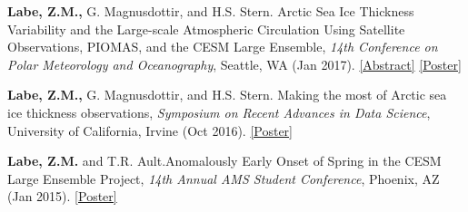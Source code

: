 \documentclass[margin,line,palatino,courier,10pt]{res}
\begin{document}
\begin{resume}
\begin{etaremune}[leftmargin=0in,topsep=0in,parsep=0in]
\item \textbf{Labe, Z.M.,} G. Magnusdottir, and H.S. Stern. Arctic Sea Ice Thickness Variability and the Large-scale Atmospheric Circulation Using Satellite Observations, PIOMAS, and the CESM Large Ensemble, \textit{14th Conference on Polar Meteorology and Oceanography}, Seattle, WA (Jan 2017). \href{https://ams.confex.com/ams/97Annual/webprogram/Paper313445.html}{[Abstract]} \href{https://zacklabe.files.wordpress.com/2022/08/c332e-zlabemagnusdottirstern_amsposter_2017.pdf}{[Poster]}
\item \textbf{Labe, Z.M.,} G. Magnusdottir, and H.S. Stern. Making the most of Arctic sea ice thickness observations, \textit{Symposium on Recent Advances in Data Science}, University of California, Irvine (Oct 2016). \href{https://zacklabe.files.wordpress.com/2022/08/c4b1e-zlabemagnusdottirstern_dsiposter_oct16.pdf}{[Poster]}
\item \textbf{Labe, Z.M.} and T.R. Ault.\@ Anomalously Early Onset of Spring in the CESM Large Ensemble Project, \textit{14th Annual AMS Student Conference}, Phoenix, AZ (Jan 2015). \href{https://ams.confex.com/ams/95Annual/webprogram/Paper271063.html}{[Poster]}

\end{etaremune}


\end{resume}
\end{document}
